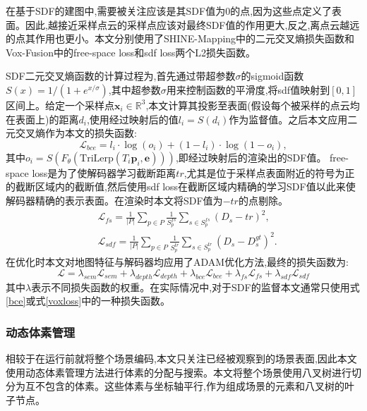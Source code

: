 在基于SDF的建图中,需要被关注应该是其SDF值为0的点,因为这些点定义了表面。因此,越接近采样点云的采样点应该对最终SDF值的作用更大,反之,离点云越远的点其作用也更小。本文分别使用了SHINE-Mapping中的二元交叉熵损失函数和Vox-Fusion中的free-space loss和sdf loss两个L2损失函数。

SDF二元交叉熵函数的计算过程为,首先通过带超参数$\sigma$的sigmoid函数$S(x) = 1/(1 + e^{x/\sigma})$,其中超参数$\sigma$用来控制函数的平滑度,将sdf值映射到$[0,1]$区间上。给定一个采样点$\mathbf{x}_i\in \mathbb{R}^3$,本文计算其投影至表面(假设每个被采样的点云均在表面上)的距离$d_i$,使用经过映射后的值$l_i=S(d_i)$作为监督值。之后本文应用二元交叉熵作为本文的损失函数:
\begin{equation}
    \mathcal{L}_{bce} = l_i\cdot \log(o_i)+(1-l_i)\cdot\log(1-o_i),\label{bce}
\end{equation}
其中$o_i=S(F_\theta(\mbox{TriLerp}(T_i\mathbf{p}_i,\mathbf{e})))$,即经过映射后的渲染出的SDF值。
free-space loss是为了使解码器学习截断距离$tr$,尤其是位于采样点表面附近的符号为正的截断区域内的截断值,然后使用sdf loss在截断区域内精确的学习SDF值以此来使解码器精确的表示表面。在渲染时本文将SDF值为$-tr$的点剔除。
\begin{equation}
    \begin{aligned}
        &\mathcal{L}_{fs} = \frac{1}{|P|}\sum_{p\in P}\frac{1}{S_p^{fs}}\sum_{s\in S_p^{fs}}(D_s-tr)^2,\\
    &\mathcal{L}_{sdf} = \frac{1}{|P|}\sum_{p\in P}\frac{1}{S_p^{tr}}\sum_{s\in S_p^{tr}}(D_s-D_s^{gt})^2.\label{voxloss}
    \end{aligned}
\end{equation}
在优化时本文对地图特征与解码器均应用了ADAM\cite{adam}优化方法,最终的损失函数为:
\begin{equation}
    \mathcal{L} = \lambda_{sem}\mathcal{L}_{sem}+\lambda_{depth}\mathcal{L}_{depth}+\lambda_{bce}\mathcal{L}_{bce}+\lambda_{fs}\mathcal{L}_{fs}+\lambda_{sdf}\mathcal{L}_{sdf}
\end{equation}
其中$\lambda$表示不同损失函数的权重。在实际情况中,对于SDF的监督本文通常只使用式\ref{bce}或式\ref{voxloss}中的一种损失函数。
\subsubsection{动态体素管理}
相较于在运行前就将整个场景编码,本文只关注已经被观察到的场景表面,因此本文使用动态体素管理方法进行体素的分配与搜索。本文将整个场景使用八叉树进行切分为互不包含的体素。这些体素与坐标轴平行,作为组成场景的元素和八叉树的叶子节点。


